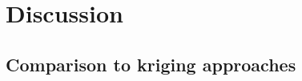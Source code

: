 \documentclass[useAMS,referee, usegraphicx]{biom}
\begin{document}
\section{Discussion}
\label{conclusion}





\subsection{Comparison to kriging approaches}

%
%
%
\end{document}
